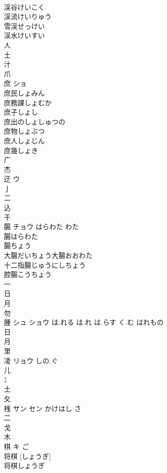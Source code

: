 \documentclass[8pt]{extreport}
\begin{document}
\begin{CJK}{UTF8}{min}
\\	渓谷けいこく 
\\	渓流けいりゅう 
\\	雪渓せっけい 
\\	渓水けいすい 
\\	人 
\\	土 
\\	汁 
\\	爪 
\\	庶	ショ		
\\	庶民しょみん 
\\	庶務課しょむか 
\\	庶子しょし 
\\	庶出のしょしゅつの 
\\	庶物しょぶつ 
\\	庶人しょじん 
\\	庶幾しょき 
\\	广 
\\	杰	
\\	迂	ウ		
\\	亅 
\\	二 
\\	込 
\\	干 
\\	腸	チョウ	はらわた わた	
\\	腸はらわた
\\	腸ちょう
\\	大腸だいちょう大腸おおわた
\\	十二指腸じゅうにしちょう
\\	腔腸こうちょう
\\	一 
\\	日 
\\	月 
\\	勿 
\\	腫	シュ ショウ	は.れる は.れ は.らす く.む はれもの	
\\	日 
\\	月 
\\	里 
\\	凌	リョウ	しの.ぐ	
\\	儿 
\\	冫 
\\	土 
\\	夂 
\\	桟	サン セン	かけはし さ	
\\	二 
\\	戈 
\\	木 
\\	棋	キ	ご	
\\	将棋 [しょうぎ] 
\\	将棋しょうぎ

\end{CJK}
\end{document}

